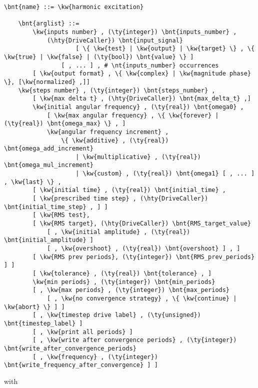 \begin{Verbatim}[commandchars=\\\{\}]
    \bnt{name} ::= \kw{harmonic excitation}

    \bnt{arglist} ::=
        \kw{inputs number} , (\ty{integer}) \bnt{inputs_number} ,
            (\hty{DriveCaller}) \bnt{input_signal}
                    [ \{ \kw{test} | \kw{output} | \kw{target} \} , \{ \kw{true} | \kw{false} | (\ty{bool}) \bnt{value} \} ]
                [ , ... ] , # \nt{inputs_number} occurrences
        [ \kw{output format} , \{ \kw{complex} | \kw{magnitude phase} \}, [\kw{normalized} ,]]
	\kw{steps number} , (\ty{integer}) \bnt{steps_number} ,
        [ \kw{max delta t} , (\hty{DriveCaller}) \bnt{max_delta_t} ,]
        \kw{initial angular frequency} , (\ty{real}) \bnt{omega0} ,
            [ \kw{max angular frequency} , \{ \kw{forever} | (\ty{real}) \bnt{omega_max} \} , ]
            \kw{angular frequency increment} ,
                \{ \kw{additive} , (\ty{real}) \bnt{omega_add_increment}
                    | \kw{multiplicative} , (\ty{real}) \bnt{omega_mul_increment}
                    | \kw{custom} , (\ty{real}) \bnt{omega1} [ , ... ] , \kw{last} \} ,
        [ \kw{initial time} , (\ty{real}) \bnt{initial_time} ,
	    [ \kw{prescribed time step} , (\hty{DriveCaller}) \bnt{initial_time_step} , ] ]
        [ \kw{RMS test}, 
	    [ \kw{RMS target}, (\hty{DriveCaller}) \bnt{RMS_target_value} 
	        [ , \kw{initial amplitude} , (\ty{real}) \bnt{initial_amplitude} ]
	        [ , \kw{overshoot} , (\ty{real}) \bnt{overshoot} ] , ]
	    [ \kw{RMS prev periods}, (\ty{integer}) \bnt{RMS_prev_periods} ] ]
        [ \kw{tolerance} , (\ty{real}) \bnt{tolerance} , ]
        \kw{min periods} , (\ty{integer}) \bnt{min_periods}
        [ , \kw{max periods} , (\ty{integer}) \bnt{max_periods}
            [ , \kw{no convergence strategy} , \{ \kw{continue} | \kw{abort} \} ] ]
        [ , \kw{timestep drive label} , (\ty{unsigned}) \bnt{timestep_label} ]
        [ , \kw{print all periods} ]
        [ , \kw{write after convergence periods} , (\ty{integer}) \bnt{write_after_convergence_periods} 
	    [ , \kw{frequency} , (\ty{integer}) \bnt{write_frequency_after_convergence} ] ]
\end{Verbatim}
with
